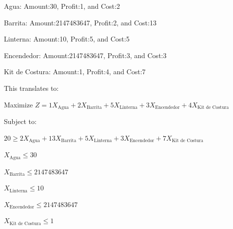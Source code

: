 \documentclass{article}
\begin{document}
Agua: Amount:30, Profit:1, and Cost:2

Barrita: Amount:2147483647, Profit:2, and Cost:13

Linterna: Amount:10, Profit:5, and Cost:5

Encendedor: Amount:2147483647, Profit:3, and Cost:3

Kit de Costura: Amount:1, Profit:4, and Cost:7




This translates to:

Maximize $Z = 1X_{\text{Agua}} + 2X_{\text{Barrita}} + 5X_{\text{Linterna}} + 3X_{\text{Encendedor}} + 4X_{\text{Kit de Costura}}$



Subject to:

$20 \geq 2X_{\text{Agua}} + 13X_{\text{Barrita}} + 5X_{\text{Linterna}} + 3X_{\text{Encendedor}} + 7X_{\text{Kit de Costura}}$

$X_{\text{Agua}} \leq 30$

$X_{\text{Barrita}} \leq 2147483647$

$X_{\text{Linterna}} \leq 10$

$X_{\text{Encendedor}} \leq 2147483647$

$X_{\text{Kit de Costura}} \leq 1$
\end{document}
